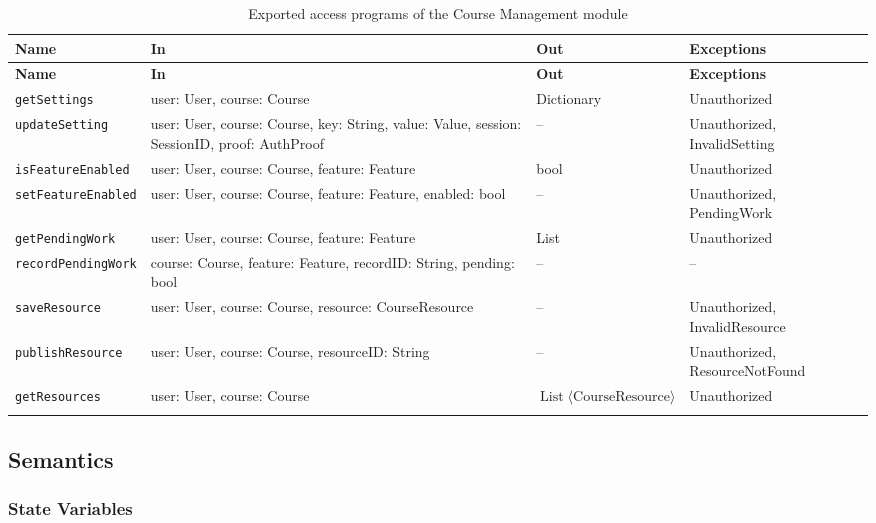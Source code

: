 \documentclass[12pt, titlepage]{article}
\begin{document}
\begingroup
\small
\setlength{\tabcolsep}{4pt}
\renewcommand{\arraystretch}{1.2}
\begin{longtable}{>{\raggedright\arraybackslash}p{}
                  >{\raggedright\arraybackslash}p{}
                  >{\raggedright\arraybackslash}p{}
                  >{\raggedright\arraybackslash}p{}}
\toprule
\textbf{Name} & \textbf{In} & \textbf{Out} & \textbf{Exceptions} \\
\midrule
\endfirsthead
\toprule
\textbf{Name} & \textbf{In} & \textbf{Out} & \textbf{Exceptions} \\
\midrule
\endhead
\endfoot
\texttt{getSettings} & user: User, course: Course & Dictionary & Unauthorized \\
\texttt{updateSetting} & user: User, course: Course, key: String, value: Value, session: SessionID, proof: AuthProof & -- & Unauthorized, InvalidSetting \\
\texttt{isFeatureEnabled} & user: User, course: Course, feature: Feature & bool & Unauthorized \\
\texttt{setFeatureEnabled} & user: User, course: Course, feature: Feature, enabled: bool & -- & Unauthorized, PendingWork \\
\texttt{getPendingWork} & user: User, course: Course, feature: Feature & List & Unauthorized \\
\texttt{recordPendingWork} & course: Course, feature: Feature, recordID: String, pending: bool & -- & -- \\
\texttt{saveResource} & user: User, course: Course, resource: CourseResource & -- & Unauthorized, InvalidResource \\
\texttt{publishResource} & user: User, course: Course, resourceID: String & -- & Unauthorized, ResourceNotFound \\
\texttt{getResources} & user: User, course: Course & $\operatorname{List}\langle\text{CourseResource}\rangle$ & Unauthorized \\
\bottomrule
\caption{Exported access programs of the Course Management module}
\label{TblCourseManagementAccessPrograms}
\end{longtable}
\endgroup

\subsection{Semantics}

\subsubsection{State Variables}
\end{document}
